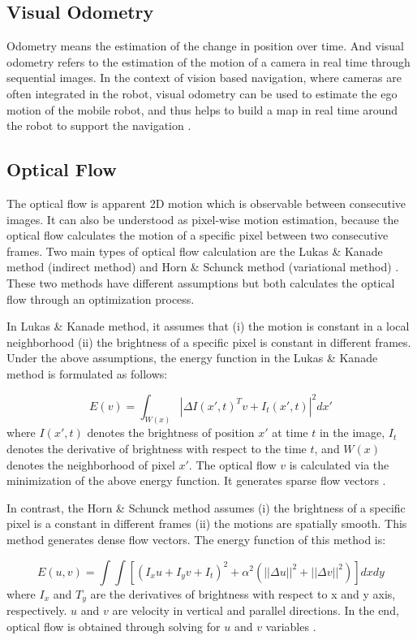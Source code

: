 \documentclass{easychair}
\begin{document}
\subsection{Visual Odometry}
Odometry means the estimation of the change in position over time. And visual odometry refers to the estimation of the motion of a camera in real time through sequential images. In the context of vision based navigation, where cameras are often integrated in the robot, visual odometry can be used to estimate the ego motion of the mobile robot, and thus helps to build a map in real time around the robot to support the navigation \cite{vo}.

\subsection{Optical Flow} The optical flow is apparent 2D motion which is observable between consecutive images. It can also be understood as pixel-wise motion estimation, because the optical flow calculates the motion of a specific pixel between two consecutive frames. Two main types of optical flow calculation are the Lukas \& Kanade method (indirect method) and Horn \& Schunck method (variational method) \cite{lukas} \cite{horn}. These two methods have different assumptions but both calculates the optical flow through an optimization process.

In Lukas \& Kanade method, it assumes that (i) the motion is constant in a local neighborhood (ii) the brightness of a specific pixel is constant in different frames. Under the above assumptions, the energy function in the Lukas \& Kanade method is formulated as follows:

\begin{equation}
E(v) = \int_{W(x)} |\Delta I(x', t)^Tv + I_t(x',t) |^2dx'
\end{equation}
\noindent
where $I(x',t)$ denotes the brightness of position $x'$ at time $t$ in the image, $I_t$ denotes the derivative of brightness with respect to the time $t$, and $W(x)$ denotes the neighborhood of pixel $x'$. The optical flow $v$ is calculated via the minimization of the above energy function. It generates sparse flow vectors \cite{lukas}.

In contrast, the Horn \& Schunck method assumes (i) the brightness of a specific pixel is a constant in different frames (ii) the motions are spatially smooth. This method generates dense flow vectors. The energy function of this method is:

\begin{equation}
E(u,v) = \int\int[(I_xu + I_yv + I_t)^2+\alpha^2(||\Delta u ||^2 + ||\Delta v ||^2)]dxdy
\end{equation} 
\noindent
where $I_x$ and $T_y$ are the derivatives of brightness with respect to x and y axis, respectively. $u$ and $v$ are velocity in vertical and parallel directions. In the end, optical flow is obtained through solving for $u$ and $v$ variables \cite{horn}.		
\end{document}
